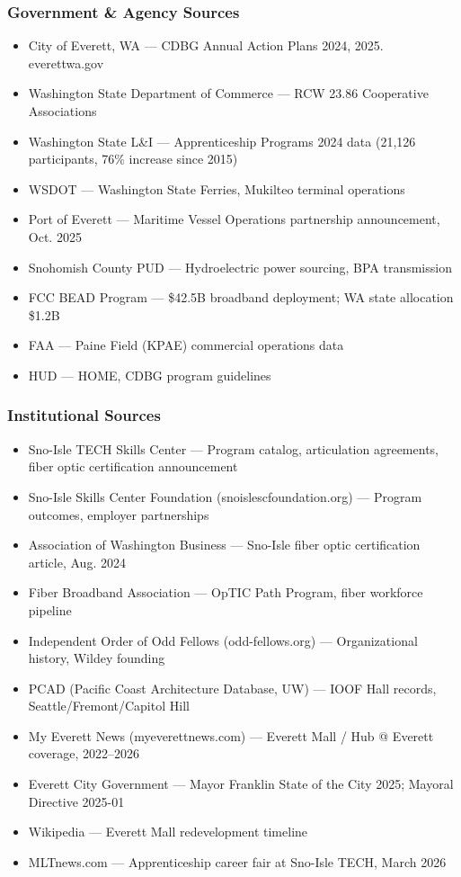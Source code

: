 \documentclass[11pt,letterpaper]{article}
\begin{document}
\subsubsection{Government \& Agency Sources}
\begin{itemize}[leftmargin=*]
  \item City of Everett, WA --- CDBG Annual Action Plans 2024, 2025. everettwa.gov
  \item Washington State Department of Commerce --- RCW 23.86 Cooperative Associations
  \item Washington State L\&I --- Apprenticeship Programs 2024 data (21,126 participants, 76\% increase since 2015)
  \item WSDOT --- Washington State Ferries, Mukilteo terminal operations
  \item Port of Everett --- Maritime Vessel Operations partnership announcement, Oct. 2025
  \item Snohomish County PUD --- Hydroelectric power sourcing, BPA transmission
  \item FCC BEAD Program --- \$42.5B broadband deployment; WA state allocation \$1.2B
  \item FAA --- Paine Field (KPAE) commercial operations data
  \item HUD --- HOME, CDBG program guidelines
\end{itemize}

\subsubsection{Institutional Sources}
\begin{itemize}[leftmargin=*]
  \item Sno-Isle TECH Skills Center --- Program catalog, articulation agreements, fiber optic certification announcement
  \item Sno-Isle Skills Center Foundation (snoislescfoundation.org) --- Program outcomes, employer partnerships
  \item Association of Washington Business --- Sno-Isle fiber optic certification article, Aug. 2024
  \item Fiber Broadband Association --- OpTIC Path Program, fiber workforce pipeline
  \item Independent Order of Odd Fellows (odd-fellows.org) --- Organizational history, Wildey founding
  \item PCAD (Pacific Coast Architecture Database, UW) --- IOOF Hall records, Seattle/Fremont/Capitol Hill
  \item My Everett News (myeverettnews.com) --- Everett Mall / Hub @ Everett coverage, 2022--2026
  \item Everett City Government --- Mayor Franklin State of the City 2025; Mayoral Directive 2025-01
  \item Wikipedia --- Everett Mall redevelopment timeline
  \item MLTnews.com --- Apprenticeship career fair at Sno-Isle TECH, March 2026
\end{itemize}
\end{document}
